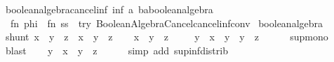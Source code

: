 \begin{isabellebody}
\isanewline
{}\isamarkupfalse%
\ boolean{\isacharunderscore}{\kern0pt}algebra{\isacharunderscore}{\kern0pt}cancel{\isacharunderscore}{\kern0pt}inf\ {\isacharparenleft}{\kern0pt}{\isachardoublequoteopen}inf\ a\ b{\isacharcolon}{\kern0pt}{\isacharcolon}{\kern0pt}{\isacharprime}{\kern0pt}a{\isacharcolon}{\kern0pt}{\isacharcolon}{\kern0pt}boolean{\isacharunderscore}{\kern0pt}algebra{\isachardoublequoteclose}{\isacharparenright}{\kern0pt}\ {\isacharequal}{\kern0pt}\isanewline
\ \ {\isacartoucheopen}fn\ phi\ {\isacharequal}{\kern0pt}{\isachargreater}{\kern0pt}\ fn\ ss\ {\isacharequal}{\kern0pt}{\isachargreater}{\kern0pt}\ try\ Boolean{\isacharunderscore}{\kern0pt}Algebra{\isacharunderscore}{\kern0pt}Cancel{\isachardot}{\kern0pt}cancel{\isacharunderscore}{\kern0pt}inf{\isacharunderscore}{\kern0pt}conv{\isacartoucheclose}%
\endisatagML
{\isafoldML}%
%
\isadelimML
\isanewline
%
\endisadelimML
\isanewline
\isanewline
{}\isamarkupfalse%
\ boolean{\isacharunderscore}{\kern0pt}algebra\isanewline
{}\isanewline
\ \ \ \ \isanewline
{}\isamarkupfalse%
\ shunt{}{\isacharcolon}{\kern0pt}\ {\isachardoublequoteopen}{\isacharparenleft}{\kern0pt}x\ {\isasymsqinter}\ y\ {\isasymle}\ z{\isacharparenright}{\kern0pt}\ {\isasymlongleftrightarrow}\ {\isacharparenleft}{\kern0pt}x\ {\isasymle}\ {\isacharminus}{\kern0pt}y\ {\isasymsqunion}\ z{\isacharparenright}{\kern0pt}{\isachardoublequoteclose}\isanewline
%
\isadelimproof
%
\endisadelimproof
%
\isatagproof
{}\isamarkupfalse%
\isanewline
\ \ \isamarkupfalse%
\ {\isachardoublequoteopen}x\ {\isasymsqinter}\ y\ {\isasymle}\ z{\isachardoublequoteclose}\isanewline
\ \ \isamarkupfalse%
\ \ {\isachardoublequoteopen}{\isacharminus}{\kern0pt}y\ {\isasymsqunion}\ {\isacharparenleft}{\kern0pt}x\ {\isasymsqinter}\ y{\isacharparenright}{\kern0pt}\ {\isasymle}\ {\isacharminus}{\kern0pt}y\ {\isasymsqunion}\ z{\isachardoublequoteclose}\isanewline
\ \ \ \ \isamarkupfalse%
\ sup{\isachardot}{\kern0pt}mono\ \isamarkupfalse%
\ blast\isanewline
\ \ \isamarkupfalse%
\ {\isachardoublequoteopen}{\isacharminus}{\kern0pt}y\ {\isasymsqunion}\ x\ {\isasymle}\ {\isacharminus}{\kern0pt}y\ {\isasymsqunion}\ z{\isachardoublequoteclose}\isanewline
\ \ \ \ \isamarkupfalse%
\ {\isacharparenleft}{\kern0pt}simp\ add{\isacharcolon}{\kern0pt}\ sup{\isacharunderscore}{\kern0pt}inf{\isacharunderscore}{\kern0pt}distrib{}{\isacharparenright}{\kern0pt}\isanewline

\end{isabellebody}
